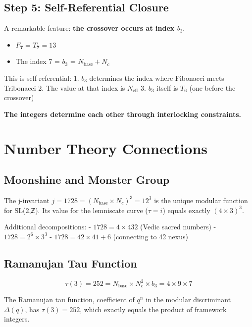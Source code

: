 \documentclass[
  11pt,
  letterpaper,
  twoside,
  openany]{book}
\makeatletter
\providecommand{\tightlist}{%
  \setlength{\itemsep}{0pt}\setlength{\parskip}{0pt}}
\let\orig@section\section
\renewcommand{\section}{\needspace{8\baselineskip}\orig@section}
\let\orig@subsection\subsection
\renewcommand{\subsection}{\needspace{6\baselineskip}\orig@subsection}
\makeatother
\begin{document}
\subsection{Step 5: Self-Referential
Closure}\label{step-5-self-referential-closure}

A remarkable feature: \textbf{the crossover occurs at index \(b_3\)}.

\begin{itemize}
\tightlist
\item
  \(F_{\mathbf{7}} = T_{\mathbf{7}} = 13\)
\item
  The index 7 = \(b_3\) = \(N_{\text{base}} + N_c\)
\end{itemize}

This is self-referential: 1. \(b_3\) determines the index where
Fibonacci meets Tribonacci 2. The value at that index is
\(N_{\text{eff}}\) 3. \(b_3\) itself is \(T_6\) (one before the
crossover)

\textbf{The integers determine each other through interlocking
constraints.}

\section{Number Theory Connections}\label{number-theory-connections}

\subsection{Moonshine and Monster
Group}\label{moonshine-and-monster-group}

The j-invariant \(j = 1728 = (N_{\text{base}} \times N_c)^3 = 12^3\) is
the unique modular function for SL(2,ℤ). Its value for the lemniscate
curve (\(\tau = i\)) equals exactly \((4 \times 3)^3\).

Additional decompositions: - \(1728 = 4 \times 432\) (Vedic sacred
numbers) - \(1728 = 2^6 \times 3^3\) - \(1728 = 42 \times 41 + 6\)
(connecting to 42 nexus)

\subsection{Ramanujan Tau Function}\label{ramanujan-tau-function}

\[\tau(3) = 252 = N_{\text{base}} \times N_c^2 \times b_3 = 4 \times 9 \times 7\]

The Ramanujan tau function, coefficient of \(q^n\) in the modular
discriminant \(\Delta(q)\), has \(\tau(3) = 252\), which exactly equals
the product of framework integers.
\end{document}
